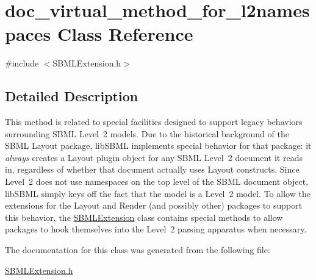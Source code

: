 \hypertarget{classdoc__virtual__method__for__l2namespaces}{}\section{doc\+\_\+virtual\+\_\+method\+\_\+for\+\_\+l2namespaces Class Reference}
\label{classdoc__virtual__method__for__l2namespaces}


{\ttfamily \#include $<$S\+B\+M\+L\+Extension.\+h$>$}



\subsection{Detailed Description}
\begin{DoxyParagraph}{}
This method is related to special facilities designed to support legacy behaviors surrounding S\+B\+ML Level~2 models. Due to the historical background of the S\+B\+ML Layout package, lib\+S\+B\+ML implements special behavior for that package\+: it {\itshape always} creates a Layout plugin object for any S\+B\+ML Level~2 document it reads in, regardless of whether that document actually uses Layout constructs. Since Level~2 does not use namespaces on the top level of the S\+B\+ML document object, lib\+S\+B\+ML simply keys off the fact that the model is a Level~2 model. To allow the extensions for the Layout and Render (and possibly other) packages to support this behavior, the \hyperlink{class_s_b_m_l_extension}{S\+B\+M\+L\+Extension} class contains special methods to allow packages to hook themselves into the Level~2 parsing apparatus when necessary. 
\end{DoxyParagraph}


The documentation for this class was generated from the following file\+:\begin{DoxyCompactItemize}
\item 
\hyperlink{_s_b_m_l_extension_8h}{S\+B\+M\+L\+Extension.\+h}\end{DoxyCompactItemize}
